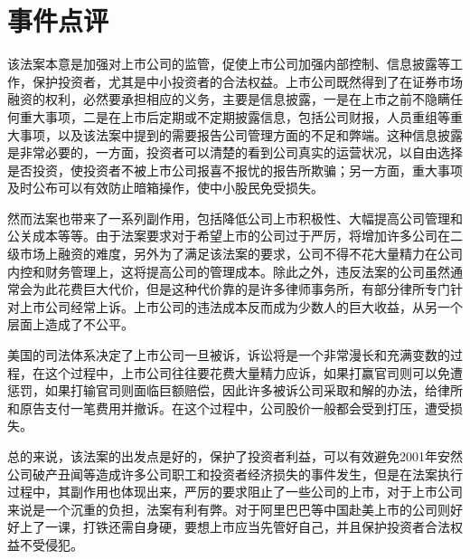 \documentclass[UTF8]{ctexart}
\begin{document}
\section{事件点评}
该法案本意是加强对上市公司的监管，促使上市公司加强内部控制、信息披露等工作，保护投资者，尤其是中小投资者的合法权益。上市公司既然得到了在证券市场融资的权利，必然要承担相应的义务，主要是信息披露，一是在上市之前不隐瞒任何重大事项，二是在上市后定期或不定期披露信息，包括公司财报，人员重组等重大事项，以及该法案中提到的需要报告公司管理方面的不足和弊端。这种信息披露是非常必要的，一方面，投资者可以清楚的看到公司真实的运营状况，以自由选择是否投资，使投资者不被上市公司报喜不报忧的报告所欺骗；另一方面，重大事项及时公布可以有效防止暗箱操作，使中小股民免受损失。\par
然而法案也带来了一系列副作用，包括降低公司上市积极性、大幅提高公司管理和公关成本等等。由于法案要求对于希望上市的公司过于严厉，将增加许多公司在二级市场上融资的难度，另外为了满足该法案的要求，公司不得不花大量精力在公司内控和财务管理上，这将提高公司的管理成本。除此之外，违反法案的公司虽然通常会为此花费巨大代价，但是这种代价靠的是许多律师事务所，有部分律所专门针对上市公司经常上诉。上市公司的违法成本反而成为少数人的巨大收益，从另一个层面上造成了不公平。\par
美国的司法体系决定了上市公司一旦被诉，诉讼将是一个非常漫长和充满变数的过程，在这个过程中，上市公司往往要花费大量精力应诉，如果打赢官司则可以免遭惩罚，如果打输官司则面临巨额赔偿，因此许多被诉公司采取和解的办法，给律所和原告支付一笔费用并撤诉。在这个过程中，公司股价一般都会受到打压，遭受损失。\par
总的来说，该法案的出发点是好的，保护了投资者利益，可以有效避免2001年安然公司破产丑闻等造成许多公司职工和投资者经济损失的事件发生，但是在法案执行过程中，其副作用也体现出来，严厉的要求阻止了一些公司的上市，对于上市公司来说是一个沉重的负担，法案有利有弊。对于阿里巴巴等中国赴美上市的公司则好好上了一课，打铁还需自身硬，要想上市应当先管好自己，并且保护投资者合法权益不受侵犯。
\end{document}
